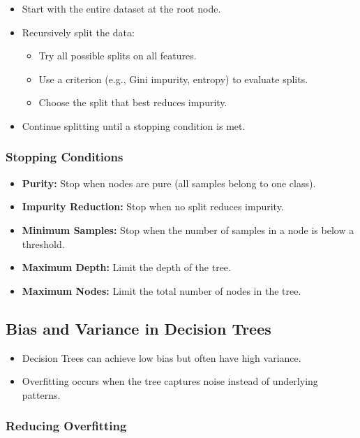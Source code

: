 \documentclass{article}
\begin{document}
\begin{itemize}
    \item Start with the entire dataset at the root node.
    \item Recursively split the data:
    \begin{itemize}
        \item Try all possible splits on all features.
        \item Use a criterion (e.g., Gini impurity, entropy) to evaluate splits.
        \item Choose the split that best reduces impurity.
    \end{itemize}
    \item Continue splitting until a stopping condition is met.
\end{itemize}

\subsubsection{Stopping Conditions}

\begin{itemize}
    \item \textbf{Purity:} Stop when nodes are pure (all samples belong to one class).
    \item \textbf{Impurity Reduction:} Stop when no split reduces impurity.
    \item \textbf{Minimum Samples:} Stop when the number of samples in a node is below a threshold.
    \item \textbf{Maximum Depth:} Limit the depth of the tree.
    \item \textbf{Maximum Nodes:} Limit the total number of nodes in the tree.
\end{itemize}

\subsection{Bias and Variance in Decision Trees}

\begin{itemize}
    \item Decision Trees can achieve low bias but often have high variance.
    \item Overfitting occurs when the tree captures noise instead of underlying patterns.
\end{itemize}

\subsubsection{Reducing Overfitting}
\end{document}
